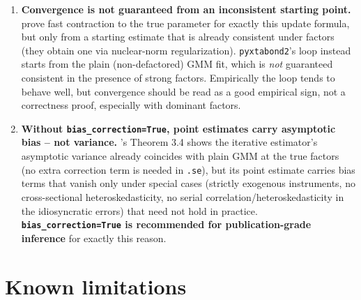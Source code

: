 \documentclass[11pt,a4paper]{article}
\newcommand{\pkg}{\texttt{pyxtabond2}}
\begin{document}
\begin{enumerate}[nosep]
  \item \textbf{Convergence is not guaranteed from an inconsistent starting
    point.} \citet{HongSuJiang2022} prove fast contraction to the true
    parameter for exactly this update formula, but only from a starting
    estimate that is already consistent under factors (they obtain one via
    nuclear-norm regularization). \pkg{}'s loop instead starts from the
    plain (non-defactored) GMM fit, which is \emph{not} guaranteed consistent
    in the presence of strong factors. Empirically the loop tends to behave
    well, but convergence should be read as a good empirical sign, not a
    correctness proof, especially with dominant factors.
  \item \textbf{Without \texttt{bias\_correction=True}, point estimates carry
    asymptotic bias -- not variance.} \citet{HongSuJiang2022}'s Theorem 3.4
    shows the iterative estimator's asymptotic variance already coincides
    with plain GMM at the true factors (no extra correction term is needed
    in \texttt{.se}), but its point estimate carries bias terms that vanish
    only under special cases (strictly exogenous instruments, no
    cross-sectional heteroskedasticity, no serial correlation/heteroskedasticity
    in the idiosyncratic errors) that need not hold in practice.
    \textbf{\texttt{bias\_correction=True} is recommended for
    publication-grade inference} for exactly this reason.
\end{enumerate}

\section{Known limitations}
\label{sec:limitations}
\end{document}
